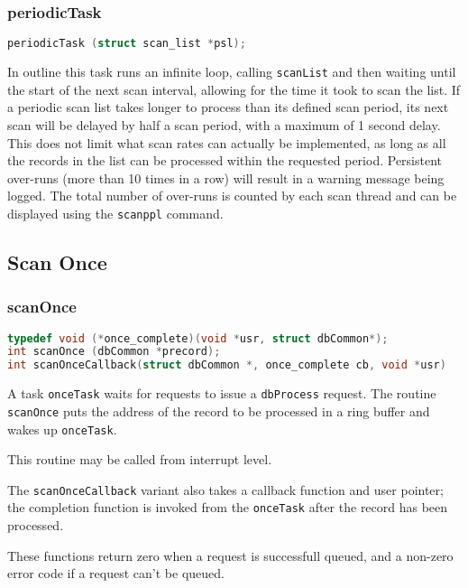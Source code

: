 \subsubsection{periodicTask}

\begin{lstlisting}[language=C]
periodicTask (struct scan_list *psl);
\end{lstlisting}

In outline this task runs an infinite loop, calling \verb|scanList| and then waiting until the start of the next scan interval, allowing for the time it took to scan the list.
If a periodic scan list takes longer to process than its defined scan period, its next scan will be delayed by half a scan period, with a maximum of 1 second delay.
This does not limit what scan rates can actually be implemented, as long as all the records in the list can be processed within the requested period.
Persistent over-runs (more than 10 times in a row) will result in a warning message being logged.
The total number of over-runs is counted by each scan thread and can be displayed using the \verb|scanppl| command.

\subsection{Scan Once}

\subsubsection{scanOnce}

\begin{lstlisting}[language=C]
typedef void (*once_complete)(void *usr, struct dbCommon*);
int scanOnce (dbCommon *precord);
int scanOnceCallback(struct dbCommon *, once_complete cb, void *usr)
\end{lstlisting}

A task \verb|onceTask| waits for requests to issue a \verb|dbProcess| request.
The routine \verb|scanOnce| puts the address of the record to be processed in a ring buffer and wakes up \verb|onceTask|.

This routine may be called from interrupt level.

The \verb|scanOnceCallback| variant also takes a callback function and user pointer; the completion function is invoked from the \verb|onceTask| after the record has been processed.

These functions return zero when a request is successfull queued, and a non-zero error code if a request can't be queued.

